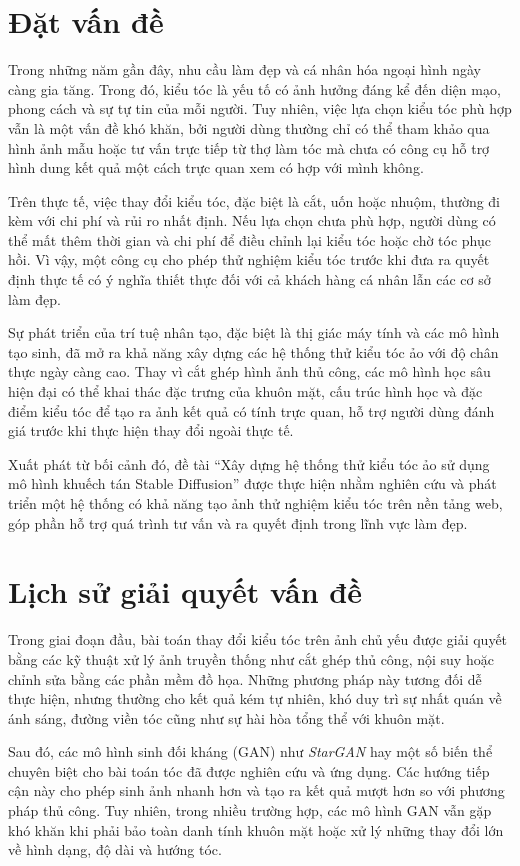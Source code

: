 \documentclass[../main.tex]{subfiles}
\begin{document}
\section{Đặt vấn đề}
Trong những năm gần đây, nhu cầu làm đẹp và cá nhân hóa ngoại hình ngày càng gia tăng. Trong đó, kiểu tóc là yếu tố có ảnh hưởng đáng kể đến diện mạo, phong cách và sự tự tin của mỗi người. Tuy nhiên, việc lựa chọn kiểu tóc phù hợp vẫn là một vấn đề khó khăn, bởi người dùng thường chỉ có thể tham khảo qua hình ảnh mẫu hoặc tư vấn trực tiếp từ thợ làm tóc mà chưa có công cụ hỗ trợ hình dung kết quả một cách trực quan xem có hợp với mình không.

Trên thực tế, việc thay đổi kiểu tóc, đặc biệt là cắt, uốn hoặc nhuộm, thường đi kèm với chi phí và rủi ro nhất định. Nếu lựa chọn chưa phù hợp, người dùng có thể mất thêm thời gian và chi phí để điều chỉnh lại kiểu tóc hoặc chờ tóc phục hồi. Vì vậy, một công cụ cho phép thử nghiệm kiểu tóc trước khi đưa ra quyết định thực tế có ý nghĩa thiết thực đối với cả khách hàng cá nhân lẫn các cơ sở làm đẹp.

Sự phát triển của trí tuệ nhân tạo, đặc biệt là thị giác máy tính và các mô hình tạo sinh, đã mở ra khả năng xây dựng các hệ thống thử kiểu tóc ảo với độ chân thực ngày càng cao. Thay vì cắt ghép hình ảnh thủ công, các mô hình học sâu hiện đại có thể khai thác đặc trưng của khuôn mặt, cấu trúc hình học và đặc điểm kiểu tóc để tạo ra ảnh kết quả có tính trực quan, hỗ trợ người dùng đánh giá trước khi thực hiện thay đổi ngoài thực tế.

Xuất phát từ bối cảnh đó, đề tài ``Xây dựng hệ thống thử kiểu tóc ảo sử dụng mô hình khuếch tán Stable Diffusion'' được thực hiện nhằm nghiên cứu và phát triển một hệ thống có khả năng tạo ảnh thử nghiệm kiểu tóc trên nền tảng web, góp phần hỗ trợ quá trình tư vấn và ra quyết định trong lĩnh vực làm đẹp.

\section{Lịch sử giải quyết vấn đề}
Trong giai đoạn đầu, bài toán thay đổi kiểu tóc trên ảnh chủ yếu được giải quyết bằng các kỹ thuật xử lý ảnh truyền thống như cắt ghép thủ công, nội suy hoặc chỉnh sửa bằng các phần mềm đồ họa. Những phương pháp này tương đối dễ thực hiện, nhưng thường cho kết quả kém tự nhiên, khó duy trì sự nhất quán về ánh sáng, đường viền tóc cũng như sự hài hòa tổng thể với khuôn mặt.

Sau đó, các mô hình sinh đối kháng (GAN) như \textit{StarGAN} hay một số biến thể chuyên biệt cho bài toán tóc đã được nghiên cứu và ứng dụng. Các hướng tiếp cận này cho phép sinh ảnh nhanh hơn và tạo ra kết quả mượt hơn so với phương pháp thủ công. Tuy nhiên, trong nhiều trường hợp, các mô hình GAN vẫn gặp khó khăn khi phải bảo toàn danh tính khuôn mặt hoặc xử lý những thay đổi lớn về hình dạng, độ dài và hướng tóc.
\end{document}
